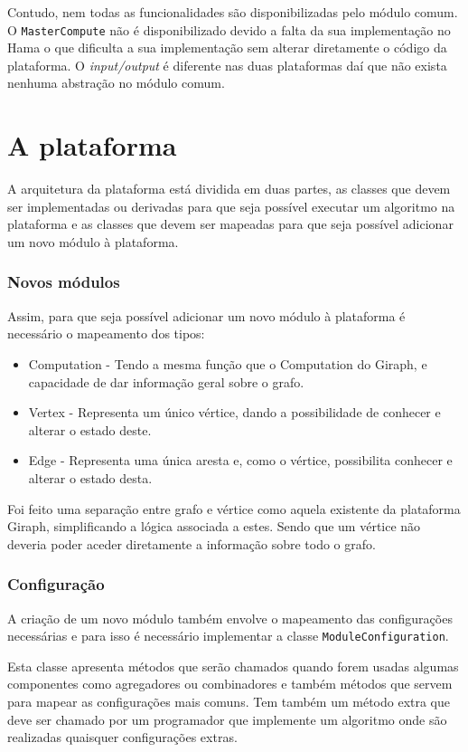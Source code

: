 Contudo, nem todas as funcionalidades são disponibilizadas pelo módulo comum.
O \texttt{MasterCompute} não é disponibilizado devido a falta da sua implementação no Hama o que dificulta a sua implementação sem alterar diretamente o código da plataforma.
O \textit{input/output} é diferente nas 
duas plataformas daí que não exista nenhuma abstração no módulo comum.



\section{A plataforma}
A arquitetura da plataforma está dividida em duas partes, as classes que devem ser implementadas ou derivadas para que seja possível executar um algoritmo na plataforma e as classes que devem ser mapeadas para que seja possível adicionar um novo módulo à plataforma.

\subsubsection*{Novos módulos}

Assim, para que seja possível adicionar um novo módulo à plataforma é necessário o mapeamento dos tipos:
\begin{itemize}
	\item Computation - Tendo a mesma função que o Computation do Giraph, e capacidade de dar informação geral sobre o grafo.
	\item Vertex - Representa um único vértice, dando a possibilidade de conhecer e alterar o estado deste.
	\item Edge - Representa uma única aresta e, como o vértice, possibilita conhecer e alterar o estado desta.
\end{itemize}
Foi feito uma separação entre grafo e vértice como aquela existente da plataforma Giraph, simplificando a lógica associada a estes. Sendo que um vértice não deveria poder aceder diretamente a informação sobre todo o grafo.

\subsubsection*{Configuração}
A criação de um novo módulo também envolve o mapeamento das configurações necessárias e para isso é necessário implementar a classe \texttt{ModuleConfiguration}.

Esta classe apresenta métodos que serão chamados quando forem usadas algumas componentes como agregadores ou combinadores e também métodos que servem para mapear as configurações mais comuns. 
Tem também um método extra que deve ser chamado por um programador que implemente um algoritmo onde são realizadas quaisquer configurações extras.

